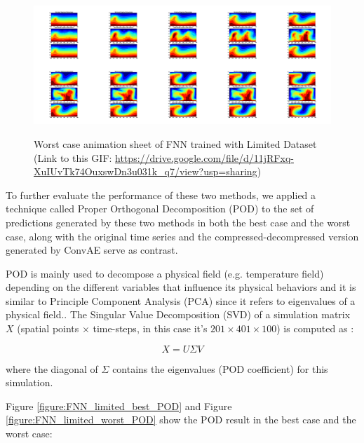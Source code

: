 \begin{figure}[H]
    \centering
    \caption{Worst case animation sheet of FNN trained with Limited Dataset (Link to this GIF: 
    \url{https://drive.google.com/file/d/11jRFxq-XuIUvTk74OuxswDn3u031k_q7/view?usp=sharing})}
    \includegraphics[scale=0.10]{figures/mantle_convection_images/limited_dataset/FNN_Worst_GIF_sheet.png}
    \label{figure:FNN_limited_worst_gif}
\end{figure}

To further evaluate the performance of these two methods, we applied a technique called Proper Orthogonal Decomposition (POD) to the set of predictions generated by these two methods in both the best case and the worst case, along with the original time series and the compressed-decompressed version generated by ConvAE serve as contrast.

POD is mainly used to decompose a physical field (e.g. temperature field) depending on the different variables that influence its physical behaviors and it is similar to Principle Component Analysis (PCA) since it refers to eigenvalues of a physical field.\citep{10.1146_annurev.fl.25.010193.002543}. The Singular Value Decomposition (SVD) of a simulation matrix $X$ (spatial points × time-steps, in this case it's $201 \times 401 \times 100$) is computed as \citep{10.1515_9783110671490-007}:

\begin{equation}
X = U\Sigma V
\end{equation}

where the diagonal of $\Sigma$ contains the eigenvalues (POD coefficient) for this simulation.

Figure \ref{figure:FNN_limited_best_POD} and Figure \ref{figure:FNN_limited_worst_POD} show the POD result in the best case and the worst case:

